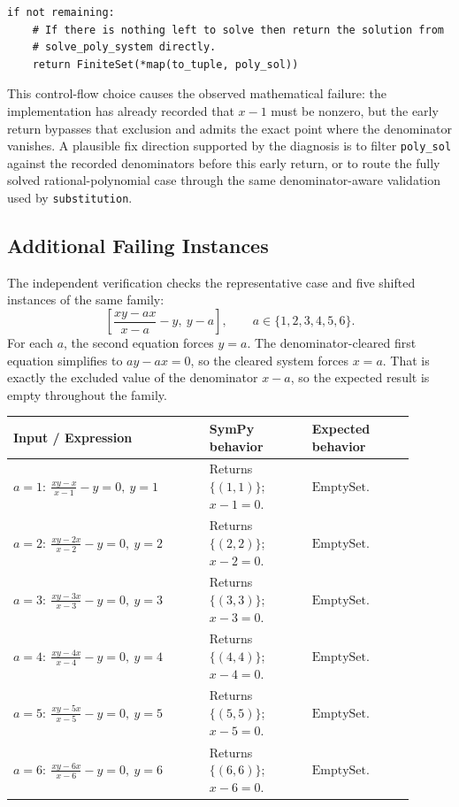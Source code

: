 \documentclass[11pt]{article}
\begin{document}
\begin{lstlisting}[style=bugpython]
if not remaining:
    # If there is nothing left to solve then return the solution from
    # solve_poly_system directly.
    return FiniteSet(*map(to_tuple, poly_sol))
\end{lstlisting}

This control-flow choice causes the observed mathematical failure: the implementation has already recorded that \(x-1\) must be nonzero, but the early return bypasses that exclusion and admits the exact point where the denominator vanishes.  A plausible fix direction supported by the diagnosis is to filter \texttt{poly\_sol} against the recorded denominators before this early return, or to route the fully solved rational-polynomial case through the same denominator-aware validation used by \texttt{substitution}.

\subsection{Additional Failing Instances}

The independent verification checks the representative case and five shifted instances of the same family:
\[
  \left[\frac{xy-a x}{x-a}-y,\ y-a\right],
  \qquad a\in\{1,2,3,4,5,6\}.
\]
For each \(a\), the second equation forces \(y=a\).  The denominator-cleared first equation simplifies to \(a y-a x=0\), so the cleared system forces \(x=a\).  That is exactly the excluded value of the denominator \(x-a\), so the expected result is empty throughout the family.

\begin{center}
\small
\renewcommand{\arraystretch}{1.3}
\begin{tabular}{@{}>{\raggedright\arraybackslash}p{0.44\linewidth}>{\raggedright\arraybackslash}p{0.23\linewidth}>{\raggedright\arraybackslash}p{0.23\linewidth}@{}}
\toprule
\textbf{Input / Expression} & \textbf{SymPy behavior} & \textbf{Expected behavior} \\
\midrule
\(a=1:\ \frac{xy-x}{x-1}-y=0,\ y=1\) & Returns \(\{(1,1)\}\); \(x-1=0\). & \(\mathrm{EmptySet}\). \\
\(a=2:\ \frac{xy-2x}{x-2}-y=0,\ y=2\) & Returns \(\{(2,2)\}\); \(x-2=0\). & \(\mathrm{EmptySet}\). \\
\(a=3:\ \frac{xy-3x}{x-3}-y=0,\ y=3\) & Returns \(\{(3,3)\}\); \(x-3=0\). & \(\mathrm{EmptySet}\). \\
\(a=4:\ \frac{xy-4x}{x-4}-y=0,\ y=4\) & Returns \(\{(4,4)\}\); \(x-4=0\). & \(\mathrm{EmptySet}\). \\
\(a=5:\ \frac{xy-5x}{x-5}-y=0,\ y=5\) & Returns \(\{(5,5)\}\); \(x-5=0\). & \(\mathrm{EmptySet}\). \\
\(a=6:\ \frac{xy-6x}{x-6}-y=0,\ y=6\) & Returns \(\{(6,6)\}\); \(x-6=0\). & \(\mathrm{EmptySet}\). \\
\bottomrule
\end{tabular}
\end{center}
\end{document}
